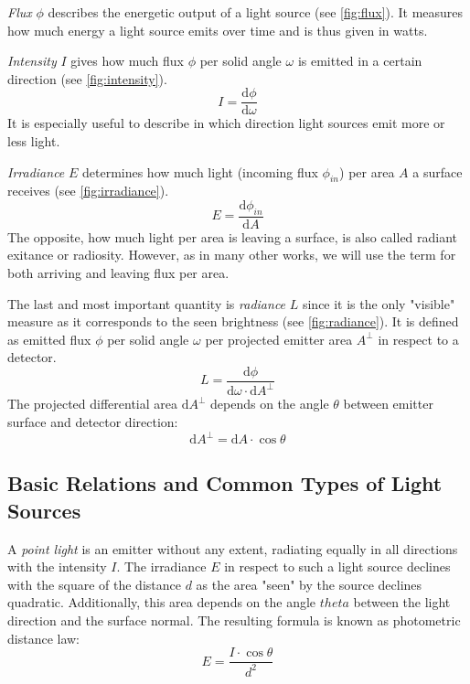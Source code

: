 \documentclass[thesis.tex]{subfiles}
\begin{document}
\emph{Flux} $\phi$ describes the energetic output of a light source (see \autoref{fig:flux}).
It measures how much energy a light source emits over time and is thus given in watts.

\emph{Intensity} $I$ gives how much flux $\phi$ per solid angle $\omega$ is emitted in a certain direction (see \autoref{fig:intensity}).
\begin{equation}
I = \frac{\mathrm{d}\phi}{\mathrm{d}\omega}
\end{equation}
It is especially useful to describe in which direction light sources emit more or less light.

\emph{Irradiance} $E$ determines how much light (incoming flux $\phi_{in}$) per area $A$ a surface receives (see \autoref{fig:irradiance}).
\begin{equation}
E = \frac{\mathrm{d}\phi_{in}}{\mathrm{d}A}
\end{equation}
The opposite, how much light per area is leaving a surface, is also called radiant exitance or radiosity.
However, as in many other works, we will use the term for both arriving and leaving flux per area. %

The last and most important quantity is \emph{radiance} $L$ since it is the only "visible" measure as it corresponds to the seen brightness (see \autoref{fig:radiance}).
It is defined as emitted flux $\phi$ per solid angle $\omega$ per projected emitter area $A^\perp$ in respect to a detector.
\begin{equation}
L = \frac{\mathrm{d}\phi}{\mathrm{d}\omega \cdot \mathrm{d}A^\perp }
\end{equation}
The projected differential area $\mathrm{d}A^\perp$ depends on the angle $\theta$ between emitter surface and detector direction:
\begin{equation}
\mathrm{d}A^\perp = \mathrm{d}A \cdot \cos\theta
\end{equation}


\subsection{Basic Relations and Common Types of Light Sources} \label{sec:preq:theo:relation}
A \emph{point light} is an emitter without any extent, radiating equally in all directions with the intensity $I$.
The irradiance  $E$ in respect to such a light source declines with the square of the distance $d$ as the area "seen" by the source declines quadratic.
Additionally, this area depends on the angle $theta$ between the light direction and the surface normal.
The resulting formula is known as photometric distance law:
\begin{equation}
E = \frac{I \cdot \cos\theta}{d^2}
\end{equation}
\end{document}
